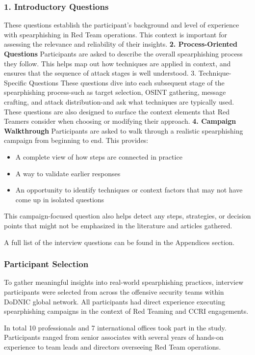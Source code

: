 \subsubsection{\textbf{1. Introductory Questions}}
These questions establish the participant's background and level of experience with spearphishing in Red Team operations. This context is important for assessing the relevance and reliability of their insights.
\textbf{2. Process-Oriented Questions}
Participants are asked to describe the overall spearphishing process they follow. This helps map out how techniques are applied in context, and ensures that the sequence of attack stages is well understood.
3. Technique-Specific Questions
These questions dive into each subsequent stage of the spearphishing process-such as target selection, OSINT gathering, message crafting, and attack distribution-and ask what techniques are typically used. These questions are also designed to surface the context elements that Red Teamers consider when choosing or modifying their approach.
\textbf{4. Campaign Walkthrough}
Participants are asked to walk through a realistic spearphishing campaign from beginning to end. This provides:
\begin{itemize}
    \item A complete view of how steps are connected in practice
    \item A way to validate earlier responses
    \item An opportunity to identify techniques or context factors that may not have come up in isolated questions
\end{itemize}

This campaign-focused question also helps detect any steps, strategies, or decision points that might not be emphasized in the literature and articles gathered.

A full list of the interview questions can be found in the Appendices section.

\subsubsection{Participant Selection}
To gather meaningful insights into real-world spearphishing practices, interview participants were selected from across the offensive security teams within DoDNIC global network. All participants had direct experience executing spearphishing campaigns in the context of Red Teaming and CCRI engagements.

In total 10 professionals and 7 international offices took part in the study. Participants ranged from senior associates with several years of hands-on experience to team leads and directors overseeing Red Team operations.

